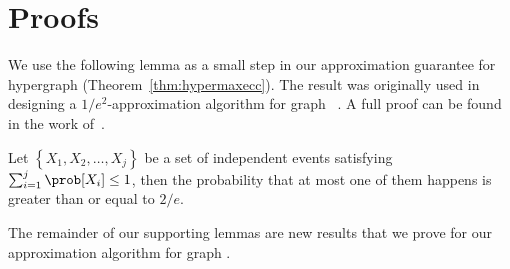 \section{\maxecc{} Proofs}
\label{app:maxecc}
We use the following lemma as a small step in our approximation guarantee for hypergraph \maxecc{} (Theorem~\ref{thm:hypermaxecc}). The result was originally used in designing a $1/e^2$-approximation algorithm for graph \maxecc{}~\cite{angel2016clustering}. A full proof can be found in the work of~\cite{angel2016clustering}.
\begin{lemma}
	\label{lem:angel}
	Let $\left\{X_1, X_2, \dots, X_j \right\}$ be a set of independent events satisfying $\sum_{i=1}^j \prob[X_i] \leq 1$, then the probability that {at most one} of them happens is greater than or equal to $2/e$.
\end{lemma}

The remainder of our supporting lemmas are new results that we prove for our approximation algorithm for graph \maxecc{}.


